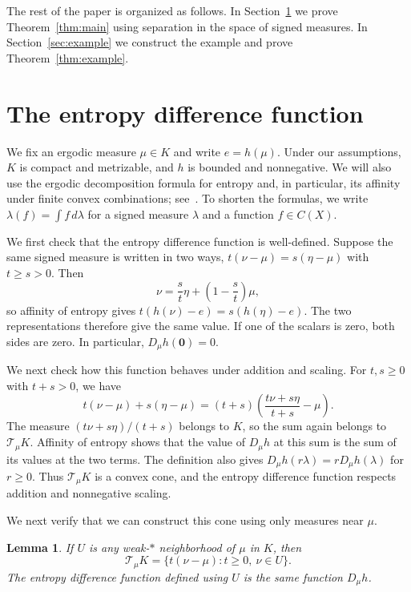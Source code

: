 \documentclass[10pt]{amsart}
\numberwithin{equation}{section}
\newtheorem{lemma}{Lemma}[section]
\newcommand{\CT}{\mathcal T}
\newcommand{\zeromeasure}{\mathbf{0}}
\begin{document}
The rest of the paper is organized as follows. In Section~\ref{sec:cone}
we prove Theorem~\ref{thm:main} using separation in the space of signed
measures. In Section~\ref{sec:example} we construct the example and
prove Theorem~\ref{thm:example}.

\section{The entropy difference function}\label{sec:cone}

We fix an ergodic measure $\mu\in K$ and write $e=h(\mu)$. Under our
assumptions, $K$ is compact and metrizable, and $h$ is bounded and
nonnegative. We will also use the ergodic decomposition formula for
entropy and, in particular, its affinity under finite convex
combinations; see~\cite{downarowicz,kerr-li}. To shorten the formulas,
we write $\lambda(f)=\int f\,d\lambda$ for a signed measure $\lambda$
and a function $f\in C(X)$.

We first check that the entropy difference function is well-defined.
Suppose the same signed measure is written in two ways,
$t(\nu-\mu)=s(\eta-\mu)$ with $t\geq s>0$. Then
\[
 \nu=\frac{s}{t}\eta+\left(1-\frac{s}{t}\right)\mu,
\]
so affinity of entropy gives $t(h(\nu)-e)=s(h(\eta)-e)$. The two
representations therefore give the same value. If one of the scalars
is zero, both sides are zero. In particular, $D_\mu h(\zeromeasure)=0$.

We next check how this function behaves under addition and scaling.
For $t,s\geq0$ with $t+s>0$, we have
\[
 t(\nu-\mu)+s(\eta-\mu)
 =(t+s)\left(\frac{t\nu+s\eta}{t+s}-\mu\right).
\]
The measure $(t\nu+s\eta)/(t+s)$ belongs to $K$, so the sum again
belongs to $\CT_\mu K$. Affinity of entropy shows that the value of
$D_\mu h$ at this sum is the sum of its values at the two terms.
The definition also gives $D_\mu h(r\lambda)=rD_\mu h(\lambda)$ for
$r\geq0$. Thus $\CT_\mu K$ is a convex cone, and the entropy
difference function respects addition and nonnegative scaling.

We next verify that we can construct this cone using only measures
near $\mu$.

\begin{lemma}\label{lem:locality}
If $U$ is any weak\nobreakdash-$*$ neighborhood of $\mu$ in $K$, then
\[
 \CT_\mu K=\{t(\nu-\mu):t\geq0,\ \nu\in U\}.
\]
The entropy difference function defined using $U$ is the same function
$D_\mu h$.
\end{lemma}
\end{document}

